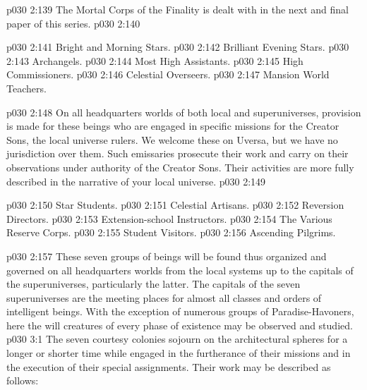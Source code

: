 \pc \vs p030 2:139 The Mortal Corps of the Finality is dealt with in the next and final paper of this series.
\pc \vs p030 2:140 \bibnobreakspace {}
\begin{ubquote}
\pc \vs p030 2:141 \bibnobreakspace Bright and Morning Stars.
\vs p030 2:142 \bibnobreakspace Brilliant Evening Stars.
\vs p030 2:143 \bibnobreakspace Archangels.
\vs p030 2:144 \bibnobreakspace Most High Assistants.
\vs p030 2:145 \bibnobreakspace High Commissioners.
\vs p030 2:146 \bibnobreakspace Celestial Overseers.
\vs p030 2:147 \bibnobreakspace Mansion World Teachers.
\end{ubquote}
\pc \vs p030 2:148 On all headquarters worlds of both local and superuniverses, provision is made for these beings who are engaged in specific missions for the Creator Sons, the local universe rulers. We welcome these  on Uversa, but we have no jurisdiction over them. Such emissaries prosecute their work and carry on their observations under authority of the Creator Sons. Their activities are more fully described in the narrative of your local universe.\plusone
\pc \vs p030 2:149 \bibnobreakspace {}
\begin{ubquote}
\pc \vs p030 2:150 \bibnobreakspace Star Students.
\vs p030 2:151 \bibnobreakspace Celestial Artisans.
\vs p030 2:152 \bibnobreakspace Reversion Directors.
\vs p030 2:153 \bibnobreakspace Extension\hyp{}school Instructors.
\vs p030 2:154 \bibnobreakspace The Various Reserve Corps.
\vs p030 2:155 \bibnobreakspace Student Visitors.
\vs p030 2:156 \bibnobreakspace Ascending Pilgrims.
\end{ubquote}
\pc \vs p030 2:157 These seven groups of beings will be found thus organized and governed on all headquarters worlds from the local systems up to the capitals of the superuniverses, particularly the latter. The capitals of the seven superuniverses are the meeting places for almost all classes and orders of intelligent beings. With the exception of numerous groups of Paradise\hyp{}Havoners, here the will creatures of every phase of existence may be observed and studied.\plusone
{}
\vs p030 3:1 The seven courtesy colonies sojourn on the architectural spheres for a longer or shorter time while engaged in the furtherance of their missions and in the execution of their special assignments. Their work may be described as follows:
